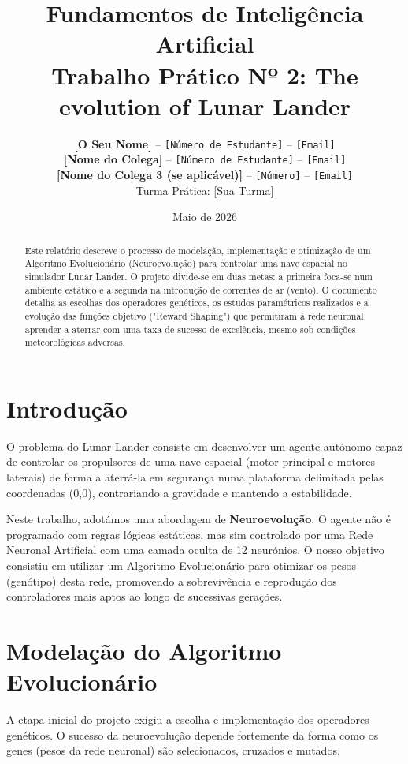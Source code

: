 \documentclass[11pt,a4paper]{article}
\title{
    \vspace{-1.5cm}
    \textbf{Fundamentos de Inteligência Artificial} \\
    \large Trabalho Prático Nº 2: The evolution of Lunar Lander
}
\author{
    \textbf{[O Seu Nome]} -- \texttt{[Número de Estudante]} -- \texttt{[Email]} \\
    \textbf{[Nome do Colega]} -- \texttt{[Número de Estudante]} -- \texttt{[Email]} \\
    \textbf{[Nome do Colega 3 (se aplicável)]} -- \texttt{[Número]} -- \texttt{[Email]} \\
    Turma Prática: [Sua Turma]
}
\date{Maio de 2026}
\begin{document}
\maketitle

\begin{abstract}
Este relatório descreve o processo de modelação, implementação e otimização de um Algoritmo Evolucionário (Neuroevolução) para controlar uma nave espacial no simulador Lunar Lander. O projeto divide-se em duas metas: a primeira foca-se num ambiente estático e a segunda na introdução de correntes de ar (vento). O documento detalha as escolhas dos operadores genéticos, os estudos paramétricos realizados e a evolução das funções objetivo ("Reward Shaping") que permitiram à rede neuronal aprender a aterrar com uma taxa de sucesso de excelência, mesmo sob condições meteorológicas adversas.
\end{abstract}

\newpage
\tableofcontents
\newpage

\section{Introdução}
O problema do Lunar Lander consiste em desenvolver um agente autónomo capaz de controlar os propulsores de uma nave espacial (motor principal e motores laterais) de forma a aterrá-la em segurança numa plataforma delimitada pelas coordenadas (0,0), contrariando a gravidade e mantendo a estabilidade. 

Neste trabalho, adotámos uma abordagem de \textbf{Neuroevolução}. O agente não é programado com regras lógicas estáticas, mas sim controlado por uma Rede Neuronal Artificial com uma camada oculta de 12 neurónios. O nosso objetivo consistiu em utilizar um Algoritmo Evolucionário para otimizar os pesos (genótipo) desta rede, promovendo a sobrevivência e reprodução dos controladores mais aptos ao longo de sucessivas gerações.

\section{Modelação do Algoritmo Evolucionário}
A etapa inicial do projeto exigiu a escolha e implementação dos operadores genéticos. O sucesso da neuroevolução depende fortemente da forma como os genes (pesos da rede neuronal) são selecionados, cruzados e mutados.
\end{document}
